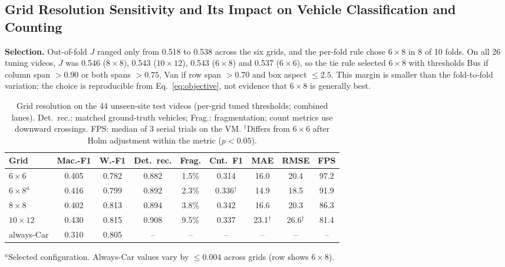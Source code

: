 \subsection{Grid Resolution Sensitivity and Its Impact on Vehicle Classification and Counting}
\label{sec:grid-sensitivity}
\textbf{Selection.} Out-of-fold $J$ ranged only from 0.518 to 0.538 across
the six grids, and the per-fold rule chose $6{\times}8$ in 8 of 10 folds.
On all 26 tuning videos, $J$ was 0.546 ($8{\times}8$), 0.543
($10{\times}12$), 0.543 ($6{\times}8$) and 0.537 ($6{\times}6$), so the tie
rule selected $6{\times}8$ with thresholds Bus if column span $>0.90$ or
both spans $>0.75$, Van if row span $>0.70$ and box aspect $\le2.5$. This
margin is smaller than the fold-to-fold variation; the choice is
reproducible from Eq.~\eqref{eq:objective}, not evidence that
$6{\times}8$ is generally best.

\begin{table}[t]
\centering
\caption{Grid resolution on the 44 unseen-site test videos (per-grid tuned
thresholds; combined lanes). Det.\ rec.: matched ground-truth vehicles;
Frag.: fragmentation; count metrics use downward crossings. FPS: median
of 3 serial trials on the VM. $^{\dagger}$Differs from $6{\times}6$ after
Holm adjustment within the metric ($p<0.05$).}
\label{tab:grid}
\scriptsize
\setlength{\tabcolsep}{2.4pt}
\begin{tabular}{lcccccccc}
\toprule
\textbf{Grid} & \textbf{Mac.-F1} & \textbf{W.-F1} & \textbf{Det.\ rec.} & \textbf{Frag.} & \textbf{Cnt.\ F1} & \textbf{MAE} & \textbf{RMSE} & \textbf{FPS}\\
\midrule
$6{\times}6$     & 0.405 & 0.782 & 0.882 & 1.5\% & 0.314 & 16.0 & 20.4 & 97.2\\
$6{\times}8^{a}$ & 0.416 & 0.799 & 0.892 & 2.3\% & 0.336$^{\dagger}$ & 14.9 & 18.5 & 91.9\\
$8{\times}8$     & 0.402 & 0.813 & 0.894 & 3.8\% & 0.342 & 16.6 & 20.3 & 86.3\\
$10{\times}12$   & 0.430 & 0.815 & 0.908 & 9.5\% & 0.337 & 23.1$^{\dagger}$ & 26.6$^{\dagger}$ & 81.4\\
always-Car       & 0.310 & 0.805 & -- & -- & -- & -- & -- & --\\
\bottomrule
\end{tabular}

\smallskip
\parbox{\columnwidth}{\scriptsize $^{a}$Selected configuration. Always-Car
values vary by $\le0.004$ across grids (row shows $6{\times}8$).}
\end{table}


